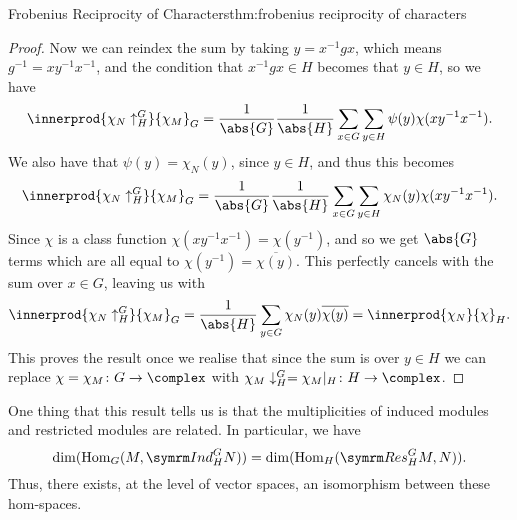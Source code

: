 \begin{thm}{Frobenius Reciprocity of Characters}{thm:frobenius reciprocity of characters}
\begin{proof}
        Now we can reindex the sum by taking \(y = x^{-1}gx\), which means \(g^{-1} = xy^{-1}x^{-1}\), and the condition that \(x^{-1}gx \in H\) becomes that \(y \in H\), so we have
        \begin{equation}
            \innerprod{\chi_N\uparrow^G_H}{\chi_M}_G = \frac{1}{\abs{G}} \frac{1}{\abs{H}} \sum_{x \in G} \sum_{y \in H} \psi(y) \chi(xy^{-1}x^{-1}).
        \end{equation}
        We also have that \(\psi(y) = \chi_N(y)\), since \(y \in H\), and thus this becomes
        \begin{equation}
            \innerprod{\chi_N\uparrow^G_H}{\chi_M}_G = \frac{1}{\abs{G}} \frac{1}{\abs{H}} \sum_{x \in G} \sum_{y \in H} \chi_N(y) \chi(xy^{-1}x^{-1}).
        \end{equation}
        Since \(\chi\) is a class function \(\chi(xy^{-1}x^{-1}) = \chi(y^{-1})\), and so we get \(\abs{G}\) terms which are all equal to \(\chi(y^{-1}) = \overline{\chi(y)}\).
        This perfectly cancels with the sum over \(x \in G\), leaving us with
        \begin{equation}
            \innerprod{\chi_N\uparrow^G_H}{\chi_M}_G = \frac{1}{\abs{H}} \sum_{y \in G} \chi_N(y) \overline{\chi(y)} = \innerprod{\chi_N}{\chi}_H.
        \end{equation}
        This proves the result once we realise that since the sum is over \(y \in H\) we can replace \(\chi = \chi_M \colon G \to \complex\) with \(\chi_M\downarrow^G_H = \chi_M|_H \colon H \to \complex\).
    \end{proof}
\end{thm}

One thing that this result tells us is that the multiplicities of induced modules and restricted modules are related.
In particular, we have
\begin{equation}
    \dim(\Hom_G(M, \Ind^G_HN)) = \dim(\Hom_H(\Res^G_HM, N)).
\end{equation}
Thus, there exists, at the level of vector spaces, an isomorphism between these hom-spaces.


